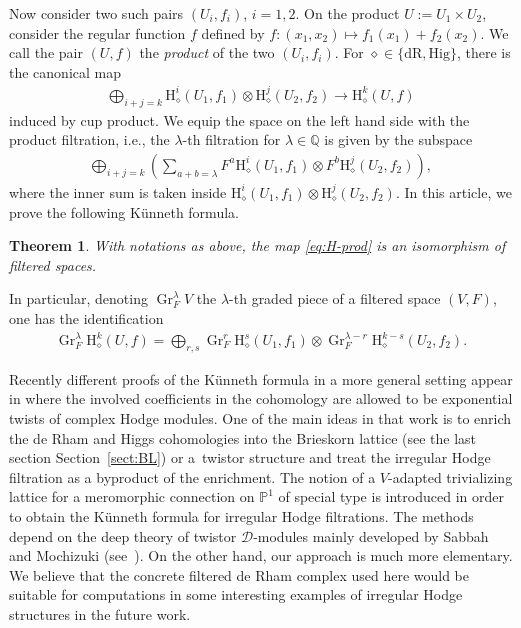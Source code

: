 \documentclass[11pt]{article}
\newcommand{\PP}{\mathbb{P}}
\newcommand{\QQ}{\mathbb{Q}}
\newcommand{\sD}{\mathscr{D}}
\newcommand{\dR}{\mathrm{dR}}
\newcommand{\Hig}{\mathrm{Hig}}
\newcommand{\coH}{\mathrm{H}}
\newcommand{\dRH}{\diamond}
\newcommand{\Gr}{\operatorname{Gr}}
\newtheorem{theorem}{Theorem}
\begin{document}
Now consider two such pairs $(U_i,f_i)$, $i=1,2$. On the product $U:=U_1\times U_2$, consider the regular function $f$ defined by $f\colon (x_1,x_2) \mapsto f_1(x_1) + f_2(x_2)$. We call the pair $(U,f)$ the \textit{product} of the two $(U_i,f_i)$. For $\dRH \in \{\dR, \Hig\}$, there is the canonical map
\begin{gather}\label{eq:H-prod}
\bigoplus_{i+j=k} \coH_\dRH^i(U_1,f_1) \otimes \coH_\dRH^j(U_2,f_2) \to \coH^k_\dRH(U,f)
\end{gather}
induced by cup product. We equip the space on the left hand side with the product filtration, i.e., the $\lambda$-th filtration for $\lambda\in\QQ$ is given by the subspace
\begin{gather*} \bigoplus_{i+j=k}\left(\sum_{a +b = \lambda} F^a\coH^i_\dRH(U_1,f_1)\otimes F^b\coH^j_\dRH(U_2,f_2) \right), \end{gather*}
where the inner sum is taken inside $\coH_\dRH^i(U_1,f_1)\otimes \coH_\dRH^j(U_2,f_2)$. In this article, we prove the following K\"unneth formula.

\begin{theorem}\label{Thm:Kunneth}
With notations as above, the map \eqref{eq:H-prod} is an isomorphism of filtered spaces.
\end{theorem}

In particular, denoting $\Gr_F^\lambda V$ the $\lambda$-th graded piece of a filtered space $(V,F)$, one has the identification
\begin{gather*} \Gr_F^\lambda\coH_\dRH^k(U,f) = \bigoplus_{r,s} \Gr_F^r\coH_\dRH^s(U_1,f_1) \otimes \Gr_F^{\lambda-r}\coH_\dRH^{k-s}(U_2,f_2). \end{gather*}

Recently different proofs of the K\"unneth formula in a more general setting appear in \cite[Theorem~3.39]{S2} where the involved coefficients in the cohomology are allowed to be exponential twists of complex Hodge modules. One of the main ideas in that work is to enrich the de Rham and Higgs cohomologies into the Brieskorn lattice (see the last section Section~\ref{sect:BL}) or a~twistor structure and treat the irregular Hodge filtration as a byproduct of the enrichment. The notion of a $V$-adapted trivializing lattice for a meromorphic connection on $\PP^1$ of special type is introduced \cite[Section~3.2.b]{S2} in order to obtain the K\"unneth formula for irregular Hodge filtrations. The methods depend on the deep theory of twistor $\sD$-modules mainly developed by Sabbah and Mochizuki (see~\cite{M_twistor}). On the other hand, our approach is much more elementary. We believe that the concrete filtered de Rham complex used here would be suitable for computations in some interesting examples of irregular Hodge structures in the future work.
\end{document}
